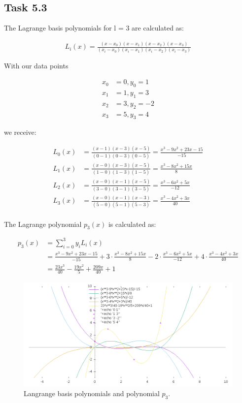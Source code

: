 \subsection*{Task 5.3}

The Lagrange basis polynomials for l = 3 are calculated as:

\begin{align*}
	L_i(x) = \frac{(x-x_0)(x-x_1)(x-x_2)(x-x_3)}{(x_i-x_0)(x_i-x_1)(x_i-x_2)(x_i-x_3)}
\end{align*}

With our data points

\begin{align*}
x_0 &= 0, y_0 = 1\\
x_1 &= 1, y_1 = 3\\
x_2 &= 3, y_2 = -2\\
x_3 &= 5, y_3 = 4\
\end{align*}

we receive:

\begin{align*}
L_0(x) &= \frac{(x-1)(x-3)(x-5)}{(0-1)(0-3)(0-5)}
 = \frac{x^3-9x^2+23x-15}{-15}\\
L_1(x) &= \frac{(x-0)(x-3)(x-5)}{(1-0)(1-3)(1-5)}
 = \frac{x^3-8x^2+15x}{8}\\
L_2(x) &= \frac{(x-0)(x-1)(x-5)}{(3-0)(3-1)(3-5)}
 = \frac{x^3-6x^2+5x}{-12}\\
L_3(x) &= \frac{(x-0)(x-1)(x-3)}{(5-0)(5-1)(5-3)}
 = \frac{x^3-4x^2+3x}{40}\\
\end{align*}

The Lagrange polynomial $p_3(x)$ is calculated as:

\begin{align*}
p_3(x) &= \sum_{i=0}^{3}y_iL_i(x) \\
&= \frac{x^3-9x^2+23x-15}{-15}+ 3\cdot \frac{x^3-8x^2+15x}{8} -2\cdot \frac{x^3-6x^2+5x}{-12}+ 4\cdot \frac{x^3-4x^2+3x}{40}\\
&= \frac{23x^3}{40}-\frac{19x^2}{5}+\frac{209x}{40}+1
\end{align*}

\begin{figure}[!h]
	\centering
	\includegraphics[width= 1\textwidth ]{task52.png}
	\caption{Langrange basis polynomials and polynomial $p_3$.}
\end{figure}